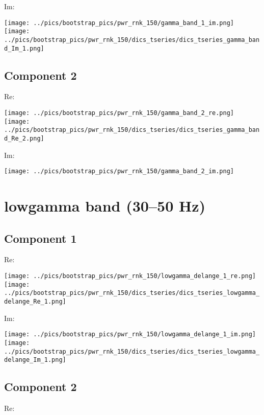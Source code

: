 \documentclass{article}
\begin{document}
Im:

\hspace{2cm}
\texttt{[image: ../pics/bootstrap\_pics/pwr\_rnk\_150/gamma\_band\_1\_im.png]}
\hspace{2cm}
\texttt{[image: ../pics/bootstrap\_pics/pwr\_rnk\_150/dics\_tseries/dics\_tseries\_gamma\_band\_Im\_1.png]}

\subsection*{Component 2}
Re:

\hspace{2cm}
\texttt{[image: ../pics/bootstrap\_pics/pwr\_rnk\_150/gamma\_band\_2\_re.png]}
\hspace{2cm}
\texttt{[image: ../pics/bootstrap\_pics/pwr\_rnk\_150/dics\_tseries/dics\_tseries\_gamma\_band\_Re\_2.png]}

Im:

\hspace{2cm}
\texttt{[image: ../pics/bootstrap\_pics/pwr\_rnk\_150/gamma\_band\_2\_im.png]}

\section{lowgamma band (30--50 Hz)}
\subsection*{Component 1}
Re:

\hspace{2cm}
\texttt{[image: ../pics/bootstrap\_pics/pwr\_rnk\_150/lowgamma\_delange\_1\_re.png]}
\hspace{2cm}
\texttt{[image: ../pics/bootstrap\_pics/pwr\_rnk\_150/dics\_tseries/dics\_tseries\_lowgamma\_delange\_Re\_1.png]}

Im:

\hspace{2cm}
\texttt{[image: ../pics/bootstrap\_pics/pwr\_rnk\_150/lowgamma\_delange\_1\_im.png]}
\hspace{2cm}
\texttt{[image: ../pics/bootstrap\_pics/pwr\_rnk\_150/dics\_tseries/dics\_tseries\_lowgamma\_delange\_Im\_1.png]}

\subsection*{Component 2}
Re:
\end{document}
